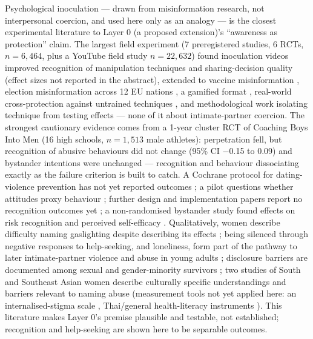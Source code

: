 \documentclass[11pt]{article}
\begin{document}
Psychological inoculation --- drawn from misinformation research, not interpersonal coercion, and used here only as an analogy --- is the closest experimental literature to Layer 0 (a proposed extension)'s ``awareness as protection'' claim. The largest field experiment (7 preregistered studies, 6 RCTs, $n=6{,}464$, plus a YouTube field study $n=22{,}632$) found inoculation videos improved recognition of manipulation techniques and sharing-decision quality \cite{ref182} (effect sizes not reported in the abstract), extended to vaccine misinformation \cite{ref183}, election misinformation across 12 EU nations \cite{ref184}, a gamified format \cite{ref185}, real-world cross-protection against untrained techniques \cite{ref186}, and methodological work isolating technique from testing effects \cite{ref187} --- none of it about intimate-partner coercion. The strongest cautionary evidence comes from a 1-year cluster RCT of Coaching Boys Into Men (16 high schools, $n=1{,}513$ male athletes): perpetration fell, but recognition of abusive behaviours did not change (95\% CI $-$0.15 to 0.09) and bystander intentions were unchanged \cite{ref190} --- recognition and behaviour dissociating exactly as the failure criterion is built to catch. A Cochrane protocol for dating-violence prevention has not yet reported outcomes \cite{ref188}; a pilot questions whether attitudes proxy behaviour \cite{ref189}; further design and implementation papers report no recognition outcomes yet \cite{ref191,ref192}; a non-randomised bystander study found effects on risk recognition and perceived self-efficacy \cite{ref193}. Qualitatively, women describe difficulty naming gaslighting despite describing its effects \cite{ref194}; being silenced through negative responses to help-seeking, and loneliness, form part of the pathway to later intimate-partner violence and abuse in young adults \cite{ref195}; disclosure barriers are documented among sexual and gender-minority survivors \cite{ref196}; two studies of South and Southeast Asian women describe culturally specific understandings and barriers relevant to naming abuse \cite{ref200,ref201} (measurement tools not yet applied here: an internalised-stigma scale \cite{ref197}, Thai/general health-literacy instruments \cite{ref198,ref199}). This literature makes Layer 0's premise plausible and testable, not established; recognition and help-seeking are shown here to be separable outcomes.
\end{document}
